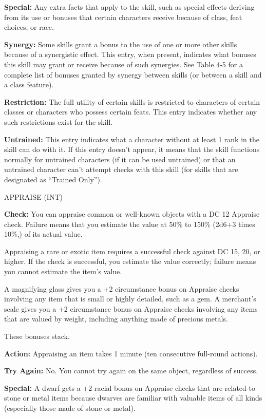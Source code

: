 \documentclass{article}
\begin{document}
\textbf{Special:} Any extra facts that apply to the skill, such as special effects 
deriving from its use or bonuses that certain characters receive because of class, 
feat choices, or race.

\textbf{Synergy:} Some skills grant a bonus to the use of one or more other skills 
because of a synergistic effect. This entry, when present, indicates what bonuses 
this skill may grant or receive because of such synergies. See Table 4-5 for a 
complete list of bonuses granted by synergy between skills (or between a skill 
and a class feature).

\textbf{Restriction:} The full utility of certain skills is restricted to characters 
of certain classes or characters who possess certain feats. This entry indicates 
whether any such restrictions exist for the skill.

\textbf{Untrained:} This entry indicates what a character without at least 1 rank 
in the skill can do with it. If this entry doesn't appear, it means that the skill 
functions normally for untrained characters (if it can be used untrained) or that 
an untrained character can't attempt checks with this skill (for skills that are 
designated as ``Trained Only'').

\vspace{12pt}
APPRAISE (INT)

\textbf{Check:} You can appraise common or well-known objects with a DC 12 Appraise 
check. Failure means that you estimate the value at 50\% to 150\% (2d6+3 times 
10\%,) of its actual value.

Appraising a rare or exotic item requires a successful check against DC 15, 20, 
or higher. If the check is successful, you estimate the value correctly; failure 
means you cannot estimate the item's value.

A magnifying glass gives you a +2 circumstance bonus on Appraise checks involving 
any item that is small or highly detailed, such as a gem. A merchant's scale gives 
you a +2 circumstance bonus on Appraise checks involving any items that are valued 
by weight, including anything made of precious metals.

These bonuses stack.

\textbf{Action:} Appraising an item takes 1 minute (ten consecutive full-round 
actions).

\textbf{Try Again:} No. You cannot try again on the same object, regardless of 
success.

\textbf{Special:} A dwarf gets a +2 racial bonus on Appraise checks that are related 
to stone or metal items because dwarves are familiar with valuable items of all 
kinds (especially those made of stone or metal).
\end{document}
